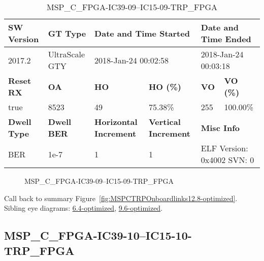 \begin{table}[h]
\centering
\caption{MSP\_C\_FPGA-IC39-09--IC15-09-TRP\_FPGA}
\label{tab:MSPCFPGAIC3909IC1509TRPFPGA12.8-optimized}
\begin{tabular}{@{}|l|l|l|l|l|l|@{}}
\toprule
\textbf{SW Version}                & \textbf{GT Type}   & \multicolumn{2}{l|}{\textbf{Date and Time Started}}            & \multicolumn{2}{l|}{\textbf{Date and Time Ended}}        \\ \midrule
2017.2                       & UltraScale GTY          & \multicolumn{2}{l|}{2018-Jan-24 00:02:58}                   & \multicolumn{2}{l|}{2018-Jan-24 00:03:18}               \\ \midrule
\textbf{Reset RX}                  & \textbf{OA} & \textbf{HO}   & \textbf{HO (\%)} & \textbf{VO} & \textbf{VO (\%)} \\ \midrule
true & 8523        & 49          & 75.38\%        & 255        & 100.00\%       \\ \midrule
\textbf{Dwell Type}                & \textbf{Dwell BER} & \textbf{Horizontal Increment} & \textbf{Vertical Increment}    & \multicolumn{2}{l|}{\textbf{Misc Info}}                  \\ \midrule
BER                            & 1e-7        & 1        & 1           & \multicolumn{2}{l|}{ELF Version: 0x4002 SVN: 0}                         \\ \bottomrule
\end{tabular}
\end{table}

\begin{figure}[h]
\caption{MSP\_C\_FPGA-IC39-09--IC15-09-TRP\_FPGA} \label{fig:MSPCFPGAIC3909IC1509TRPFPGA12.8-optimized}
\end{figure}

Call back to summary Figure~\ref{fig:MSPCTRPOnboardlinks12.8-optimized}.
Sibling eye diagrams: \hyperref[sec:MSPCFPGAIC3909IC1509TRPFPGA6.4-optimized]{6.4-optimized}, \hyperref[sec:MSPCFPGAIC3909IC1509TRPFPGA9.6-optimized]{9.6-optimized}.

\clearpage
\newpage


\subsection{MSP\_C\_FPGA-IC39-10--IC15-10-TRP\_FPGA}\label{sec:MSPCFPGAIC3910IC1510TRPFPGA12.8-optimized}

